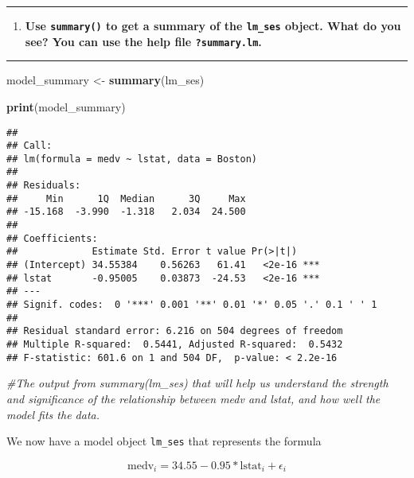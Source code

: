 \documentclass[
  12pt,
]{article}
\newenvironment{Shaded}{\begin{snugshade}}{\end{snugshade}}
\newcommand{\CommentTok}[1]{\textcolor[rgb]{0.56,0.35,0.01}{\textit{#1}}}
\newcommand{\FunctionTok}[1]{\textcolor[rgb]{0.13,0.29,0.53}{\textbf{#1}}}
\newcommand{\NormalTok}[1]{#1}
\newcommand{\OtherTok}[1]{\textcolor[rgb]{0.56,0.35,0.01}{#1}}
\providecommand{\tightlist}{%
  \setlength{\itemsep}{0pt}\setlength{\parskip}{0pt}}
\begin{document}
\begin{center}\rule{0.5\linewidth}{0.5pt}\end{center}

\begin{enumerate}
\def\labelenumi{\arabic{enumi}.}
\setcounter{enumi}{2}
\tightlist
\item
  \textbf{Use \texttt{summary()} to get a summary of the
  \texttt{lm\_ses} object. What do you see? You can use the help file
  \texttt{?summary.lm}.}
\end{enumerate}

\begin{center}\rule{0.5\linewidth}{0.5pt}\end{center}

\begin{Shaded}
\begin{Highlighting}[]
\NormalTok{model\_summary }\OtherTok{\textless{}{-}} \FunctionTok{summary}\NormalTok{(lm\_ses)}

\FunctionTok{print}\NormalTok{(model\_summary)}
\end{Highlighting}
\end{Shaded}

\begin{verbatim}
## 
## Call:
## lm(formula = medv ~ lstat, data = Boston)
## 
## Residuals:
##     Min      1Q  Median      3Q     Max 
## -15.168  -3.990  -1.318   2.034  24.500 
## 
## Coefficients:
##             Estimate Std. Error t value Pr(>|t|)    
## (Intercept) 34.55384    0.56263   61.41   <2e-16 ***
## lstat       -0.95005    0.03873  -24.53   <2e-16 ***
## ---
## Signif. codes:  0 '***' 0.001 '**' 0.01 '*' 0.05 '.' 0.1 ' ' 1
## 
## Residual standard error: 6.216 on 504 degrees of freedom
## Multiple R-squared:  0.5441, Adjusted R-squared:  0.5432 
## F-statistic: 601.6 on 1 and 504 DF,  p-value: < 2.2e-16
\end{verbatim}

\begin{Shaded}
\begin{Highlighting}[]
\CommentTok{\#The output from summary(lm\_ses) that will help us understand the strength and significance of the relationship between medv and lstat, and how well the model fits the data.}
\end{Highlighting}
\end{Shaded}

We now have a model object \texttt{lm\_ses} that represents the formula

\[\text{medv}_i = 34.55 - 0.95 * \text{lstat}_i + \epsilon_i\]
\end{document}
